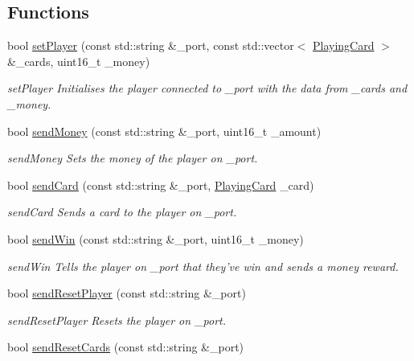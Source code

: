 \subsection*{Functions}
\begin{DoxyCompactItemize}
\item 
bool \hyperlink{namespaceComms_ad8554008bce28b575ab7a46ae1c4b821}{set\-Player} (const std\-::string \&\-\_\-port, const std\-::vector$<$ \hyperlink{classPlayingCard}{Playing\-Card} $>$ \&\-\_\-cards, uint16\-\_\-t \-\_\-money)
\begin{DoxyCompactList}\small\item\em set\-Player Initialises the player connected to \-\_\-port with the data from \-\_\-cards and \-\_\-money. \end{DoxyCompactList}\item 
bool \hyperlink{namespaceComms_a7d6a864c4776b2549220680a3a91d562}{send\-Money} (const std\-::string \&\-\_\-port, uint16\-\_\-t \-\_\-amount)
\begin{DoxyCompactList}\small\item\em send\-Money Sets the money of the player on \-\_\-port. \end{DoxyCompactList}\item 
bool \hyperlink{namespaceComms_ab5667910ab1e165e1ce83df355f3211e}{send\-Card} (const std\-::string \&\-\_\-port, \hyperlink{classPlayingCard}{Playing\-Card} \-\_\-card)
\begin{DoxyCompactList}\small\item\em send\-Card Sends a card to the player on \-\_\-port. \end{DoxyCompactList}\item 
bool \hyperlink{namespaceComms_a4dbb12818b660021ffb944c9f6f84a82}{send\-Win} (const std\-::string \&\-\_\-port, uint16\-\_\-t \-\_\-money)
\begin{DoxyCompactList}\small\item\em send\-Win Tells the player on \-\_\-port that they've win and sends a money reward. \end{DoxyCompactList}\item 
bool \hyperlink{namespaceComms_ac0e4a7381fc5fe570d69fea503489fba}{send\-Reset\-Player} (const std\-::string \&\-\_\-port)
\begin{DoxyCompactList}\small\item\em send\-Reset\-Player Resets the player on \-\_\-port. \end{DoxyCompactList}\item 
bool \hyperlink{namespaceComms_a081887fecdeda4f6a1e9f5d593b015a1}{send\-Reset\-Cards} (const std\-::string \&\-\_\-port)

\end{DoxyCompactItemize}
